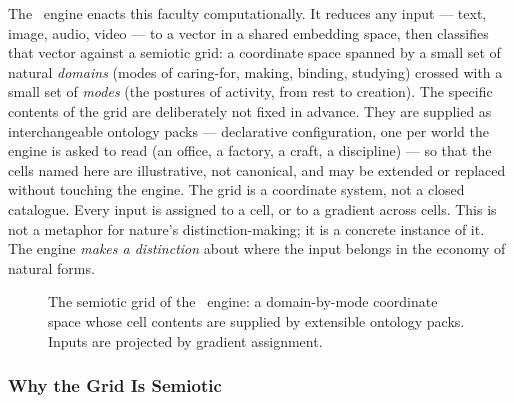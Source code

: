 The \physis\ engine enacts this faculty computationally. It reduces any input
--- text, image, audio, video --- to a vector in a shared embedding space, then
classifies that vector against a semiotic grid: a coordinate space spanned by a
small set of natural \emph{domains} (modes of caring-for, making, binding,
studying) crossed with a small set of \emph{modes} (the postures of activity, from
rest to creation). The specific contents of the grid are deliberately not fixed in
advance. They are supplied as interchangeable ontology packs --- declarative
configuration, one per world the engine is asked to read (an office, a factory,
a craft, a discipline) --- so that the cells named here are illustrative, not
canonical, and may be extended or replaced without touching the engine. The grid
is a coordinate system, not a closed catalogue. Every input is assigned to a cell,
or to a gradient across cells. This is not a metaphor for nature's
distinction-making; it is a concrete instance of it. The engine \emph{makes a
distinction} about where the input belongs in the economy of natural forms.

\begin{figure}[ht]
\centering
{}
\caption{The semiotic grid of the \physis\ engine: a domain-by-mode coordinate
space whose cell contents are supplied by extensible ontology packs. Inputs are
projected by gradient assignment.\label{fig:semiotic_grid}}
\end{figure}

\subsubsection{Why the Grid Is Semiotic}

